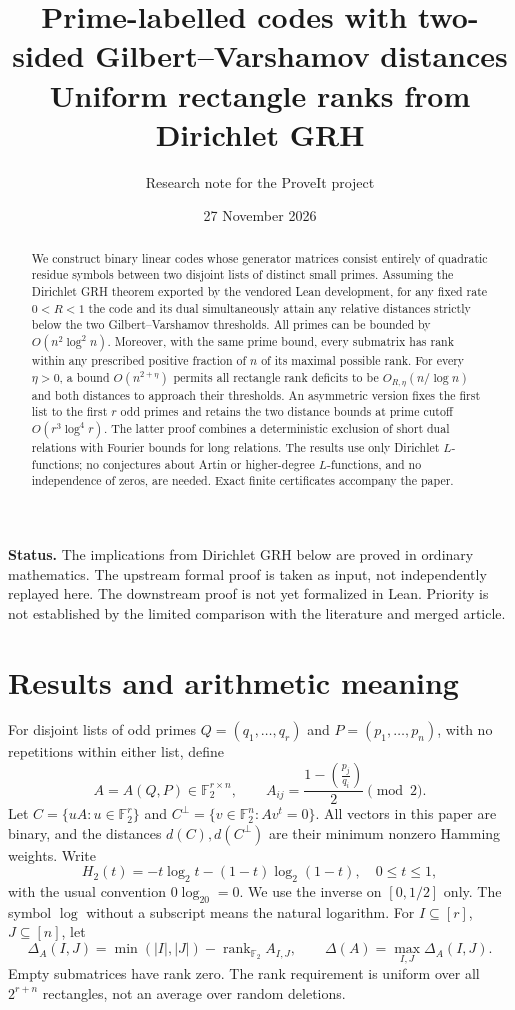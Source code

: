\documentclass[11pt]{article}
\title{Prime-labelled codes with two-sided Gilbert--Varshamov distances\protect\\[3pt]\large Uniform rectangle ranks from Dirichlet GRH}
\author{Research note for the ProveIt project}
\date{27 November 2026}
\theoremstyle{remark}\newtheorem{remark}[theorem]{Remark}
\newcommand{\F}{\mathbb F_2}
\newcommand{\rank}{\operatorname{rank}}
\newcommand{\Leg}[2]{\left(\frac{#1}{#2}\right)}
\newcommand{\Hbin}{H_2}
\begin{document}
\maketitle
\begin{abstract}
We construct binary linear codes whose generator matrices consist entirely of quadratic residue symbols between two disjoint lists of distinct small primes. Assuming the Dirichlet GRH theorem exported by the vendored Lean development, for any fixed rate $0<R<1$ the code and its dual simultaneously attain any relative distances strictly below the two Gilbert--Varshamov thresholds. All primes can be bounded by $O(n^2\log^2 n)$. Moreover, with the same prime bound, every submatrix has rank within any prescribed positive fraction of $n$ of its maximal possible rank. For every $\eta>0$, a bound $O(n^{2+\eta})$ permits all rectangle rank deficits to be $O_{R,\eta}(n/\log n)$ and both distances to approach their thresholds. An asymmetric version fixes the first list to the first $r$ odd primes and retains the two distance bounds at prime cutoff $O(r^3\log^4 r)$. The latter proof combines a deterministic exclusion of short dual relations with Fourier bounds for long relations. The results use only Dirichlet $L$-functions; no conjectures about Artin or higher-degree $L$-functions, and no independence of zeros, are needed. Exact finite certificates accompany the paper.
\end{abstract}
\noindent\textbf{Status.} The implications from Dirichlet GRH below are proved in ordinary mathematics. The upstream formal proof is taken as input, not independently replayed here. The downstream proof is not yet formalized in Lean. Priority is not established by the limited comparison with the literature and merged article.

\section{Results and arithmetic meaning}
For disjoint lists of odd primes $Q=(q_1,\ldots,q_r)$ and $P=(p_1,\ldots,p_n)$, with no repetitions within either list, define
\begin{equation}\label{eq:matrix}
 A=A(Q,P)\in\F^{r\times n},\qquad
 A_{ij}=\frac{1-\Leg{p_j}{q_i}}{2}\pmod 2.
\end{equation}
Let $C=\{uA:u\in\F^r\}$ and $C^\perp=\{v\in\F^n:Av^t=0\}$. All vectors in this paper are binary, and the distances $d(C),d(C^\perp)$ are their minimum nonzero Hamming weights. Write
\[
 \Hbin(t)=-t\log_2t-(1-t)\log_2(1-t),\quad 0\le t\le1,
\]
with the usual convention $0\log_20=0$. We use the inverse on $[0,1/2]$ only. The symbol $\log$ without a subscript means the natural logarithm. For $I\subseteq[r]$, $J\subseteq[n]$, let
\[
 \Delta_A(I,J)=\min(|I|,|J|)-\rank_{\F} A_{I,J},\qquad
 \Delta(A)=\max_{I,J}\Delta_A(I,J).
\]
Empty submatrices have rank zero. The rank requirement is uniform over all $2^{r+n}$ rectangles, not an average over random deletions.
\end{document}
